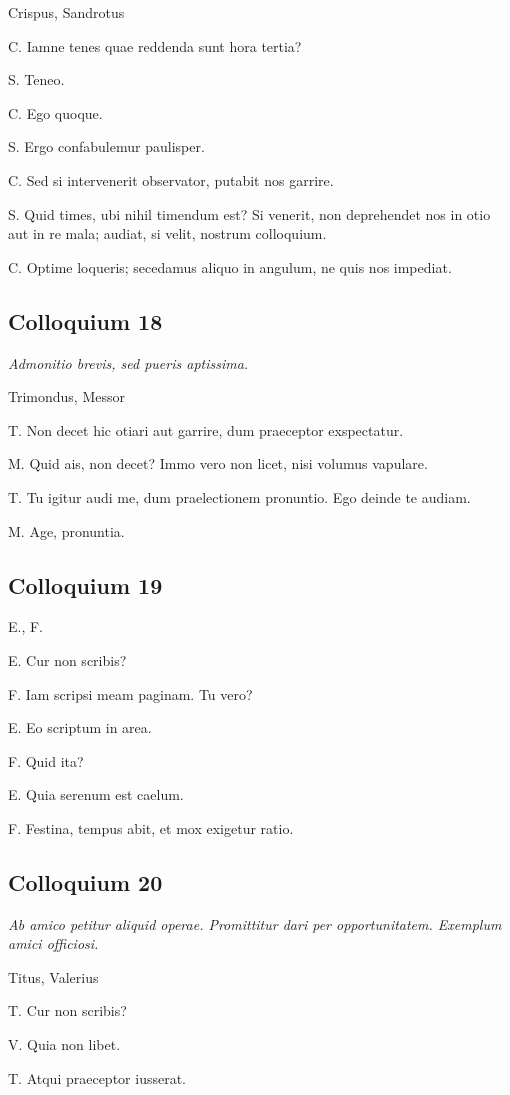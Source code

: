 \documentclass{article}
\begin{document}
Crispus, Sandrotus

C. Iamne tenes quae reddenda sunt hora tertia?

S. Teneo.

C. Ego quoque.

S. Ergo confabulemur paulisper.

C. Sed si intervenerit observator, putabit nos garrire.

S. Quid times, ubi nihil timendum est? Si venerit, non deprehendet nos in otio aut in re mala; audiat, si velit, nostrum colloquium.

C. Optime loqueris; secedamus aliquo in angulum, ne quis nos impediat.

\subsection{Colloquium 18}
\emph{Admonitio brevis, sed pueris aptissima.}

Trimondus, Messor

T. Non decet hic otiari aut garrire, dum praeceptor exspectatur.

M. Quid ais, non decet? Immo vero non licet, nisi volumus vapulare.

T. Tu igitur audi me, dum praelectionem pronuntio. Ego deinde te audiam.

M. Age, pronuntia.

\subsection{Colloquium 19}
E., F.

E. Cur non scribis?

F. Iam scripsi meam paginam. Tu vero?

E. Eo scriptum in area.

F. Quid ita?

E. Quia serenum est caelum.

F. Festina, tempus abit, et mox exigetur ratio.

\subsection{Colloquium 20}
\emph{Ab amico petitur aliquid operae. Promittitur dari per opportunitatem. Exemplum amici officiosi.}

Titus, Valerius

T. Cur non scribis?

V. Quia non libet.

T. Atqui praeceptor iusserat.
\end{document}
